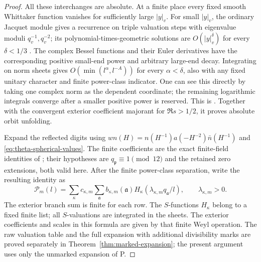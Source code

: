 \documentclass[11pt,a4paper]{article}
\numberwithin{equation}{section}
\theoremstyle{definition}
\theoremstyle{remark}
\newcommand{\Psrc}{\textup{P}}
\begin{document}
\begin{proof}
All these interchanges are absolute.  At a finite place every fixed
smooth Whittaker function vanishes for sufficiently large $|y|_v$.
For small $|y|_v$, the ordinary Jacquet module gives a recurrence on
triple valuation steps with eigenvalue moduli $q_v^{-1},q_v^{-2}$;
its polynomial-times-geometric solutions are $O(|y|_v^\delta)$ for
every $\delta<1/3$ \cite[(5.13)]{P}.  The complex Bessel functions and
their Euler derivatives have the corresponding positive small-end
power and arbitrary large-end decay.  Integrating on norm sheets gives
$O(\min(l^\alpha,l^{-A}))$ for every $\alpha<\delta$, also with any
fixed unitary character and finite power-class indicator.  One can see
this directly by taking one complex norm as the dependent coordinate;
the remaining logarithmic integrals converge after a smaller positive
power is reserved.  This is \cite[Lemma~5.4]{P}.
Together with the convergent exterior coefficient majorant for
$\Re s>1/2$, it proves absolute orbit unfolding.

Expand the reflected digits using
$wn(H)=n(H^{-1})a(-H^{-2})\bar n(H^{-1})$ and
\eqref{eq:theta-spherical-values}.  The finite coefficients are the
exact finite-field identities of \cite[Lemmas~6.2--6.3]{P}; their
hypotheses are $q_{\mathfrak p}\equiv1\pmod{12}$ and the retained zero
extensions, both valid here.  After the finite power-class separation,
write the resulting identity as
\begin{equation}\label{eq:theta-reflected-period}
 \mathcal P_m(l)=\sum_\kappa c_{\kappa,m}
       \sum_{\mathfrak a}b_{\kappa,m}(\mathfrak a)
       H_\kappa(\lambda_{\kappa,m}q_{\mathfrak a}/l),
 \qquad \lambda_{\kappa,m}>0.
\end{equation}
The exterior branch sum is finite for each row.  The $S$-functions
$H_\kappa$ belong to a fixed finite list; all $S$-valuations are integrated in the sheets.
The exterior coefficients and scales in this formula are given by
that finite Weyl operation.  The raw valuation table and the full
expansion with additional divisibility marks are proved separately in
Theorem~\ref{thm:marked-expansion}; the present argument uses only
the unmarked expansion of \Psrc.  


\end{proof}
\end{document}
